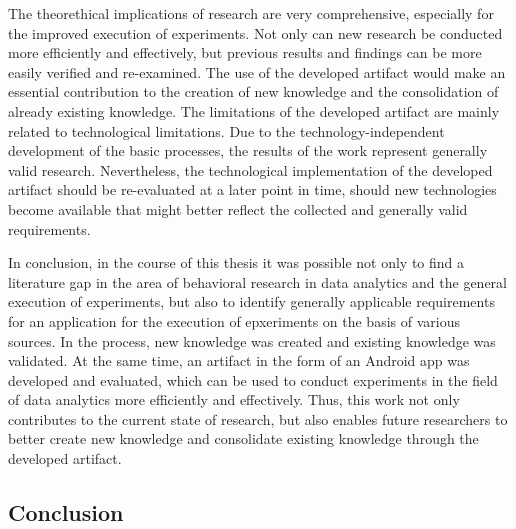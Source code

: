 The theorethical implications of research are very comprehensive, especially for the improved execution of experiments. Not only can new research be conducted more efficiently and effectively, but previous results and findings can be more easily verified and re-examined. The use of the developed artifact would make an essential contribution to the creation of new knowledge and the consolidation of already existing knowledge. The limitations of the developed artifact are mainly related to technological limitations. Due to the technology-independent development of the basic processes, the results of the work represent generally valid research. Nevertheless, the technological implementation of the developed artifact should be re-evaluated at a later point in time, should new technologies become available that might better reflect the collected and generally valid requirements.

In conclusion, in the course of this thesis it was possible not only to find a literature gap in the area of behavioral research in data analytics and the general execution of experiments, but also to identify generally applicable requirements for an application for the execution of epxeriments on the basis of various sources. In the process, new knowledge was created and existing knowledge was validated. At the same time, an artifact in the form of an Android app was developed and evaluated, which can be used to conduct experiments in the field of data analytics more efficiently and effectively. Thus, this work not only contributes to the current state of research, but also enables future researchers to better create new knowledge and consolidate existing knowledge through the developed artifact.

\subsection{Conclusion}







